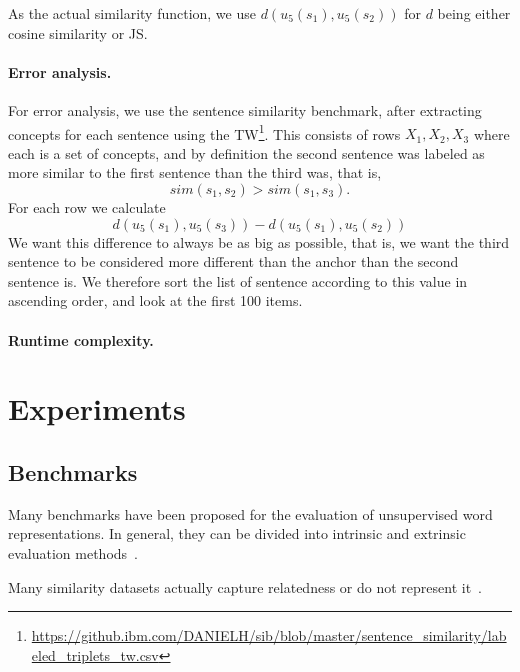 \documentclass{article}
\begin{document}
    As the actual similarity function, we use $d(u_5(s_1),u_5(s_2))$ for $d$ being either
    cosine similarity or JS.

    \paragraph{Error analysis.}
    For error analysis, we use the sentence similarity benchmark,
    after extracting concepts for each sentence using the
    TW\footnote{\url{https://github.ibm.com/DANIELH/sib/blob/master/sentence_similarity/labeled_triplets_tw.csv}}.
    This consists of rows $X_1,X_2,X_3$ where each is a set of concepts,
    and by definition the second sentence was labeled as more similar to the first
    sentence than the third was, that is,
    \[
        sim(s_1,s_2)>sim(s_1,s_3).
    \]
    For each row we calculate
    \[
        d(u_5(s_1),u_5(s_3)) - d(u_5(s_1),u_5(s_2))
    \]
    We want this difference to always be as big as possible,
    that is, we want the third sentence to be considered more different than
    the anchor than the second sentence is.
    We therefore sort the list of sentence according to this value
    in ascending order, and look at the first 100 items.

    \paragraph{Runtime complexity.}



    \section{Experiments}\label{sec:experiments}
    
    \subsection{Benchmarks}\label{sec:benchmarks}

    Many benchmarks have been proposed for the evaluation of unsupervised word
    representations.
    In general, they can be divided into intrinsic and extrinsic evaluation methods~\cite{schnabel2015evaluation,jastrzebski2017evaluate,alshargi2018concept2vec,bakarov2018survey,chiu2016intrinsic}.

    Many similarity datasets actually capture relatedness or do not represent it~\cite{hill2015simlex,avraham2016improving}.
\end{document}
